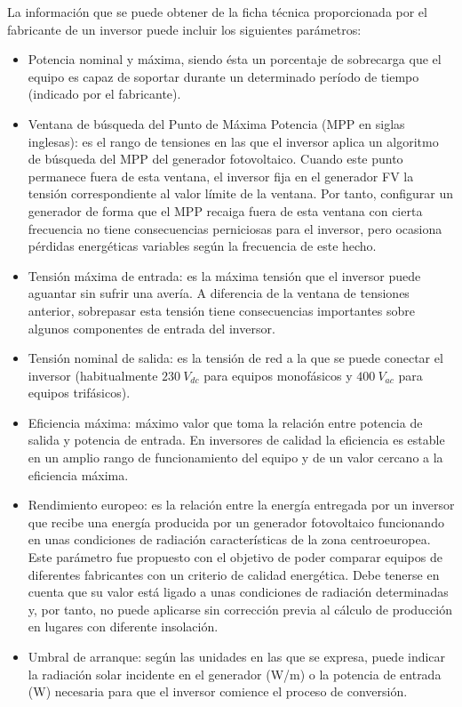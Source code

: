 La información que se puede obtener de la ficha técnica proporcionada
por el fabricante de un inversor puede incluir los siguientes parámetros:
\begin{itemize}
\item Potencia nominal y máxima, siendo ésta un porcentaje de sobrecarga
que el equipo es capaz de soportar durante un determinado período
de tiempo (indicado por el fabricante).
\item Ventana de búsqueda del Punto de Máxima Potencia (MPP en siglas inglesas):
es el rango de tensiones en las que el inversor aplica un algoritmo
de búsqueda del MPP del generador fotovoltaico. Cuando este punto
permanece fuera de esta ventana, el inversor fija en el generador
FV la tensión correspondiente al valor límite de la ventana. Por tanto,
configurar un generador de forma que el MPP recaiga fuera de esta
ventana con cierta frecuencia no tiene consecuencias perniciosas para
el inversor, pero ocasiona pérdidas energéticas variables según la
frecuencia de este hecho.
\item Tensión máxima de entrada: es la máxima tensión que el inversor puede
aguantar sin sufrir una avería. A diferencia de la ventana de tensiones
anterior, sobrepasar esta tensión tiene consecuencias importantes
sobre algunos componentes de entrada del inversor. 
\item Tensión nominal de salida: es la tensión de red a la que se puede
conectar el inversor (habitualmente $\SI{230}{V_{dc}}$ para equipos
monofásicos y $\SI{400}{V_{ac}}$ para equipos trifásicos).
\item Eficiencia máxima: máximo valor que toma la relación entre potencia
de salida y potencia de entrada. En inversores de calidad la eficiencia
es estable en un amplio rango de funcionamiento del equipo y de un
valor cercano a la eficiencia máxima.
\item Rendimiento europeo: es la relación entre la energía entregada por
un inversor que recibe una energía producida por un generador fotovoltaico
funcionando en unas condiciones de radiación características de la
zona centroeuropea. Este parámetro fue propuesto con el objetivo de
poder comparar equipos de diferentes fabricantes con un criterio de
calidad energética. Debe tenerse en cuenta que su valor está ligado
a unas condiciones de radiación determinadas y, por tanto, no puede
aplicarse sin corrección previa al cálculo de producción en lugares
con diferente insolación.
\item Umbral de arranque: según las unidades en las que se expresa, puede
indicar la radiación solar incidente en el generador (W/m\texttwosuperior{})
o la potencia de entrada (W) necesaria para que el inversor comience
el proceso de conversión.
\end{itemize}


